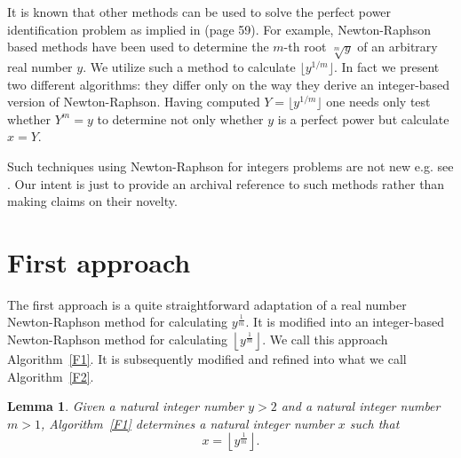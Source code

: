 \documentclass[11pt]{article}
\newtheorem{lem}{Lemma}
\newcommand{\floor}[1]{\lfloor #1 \rfloor}
\begin{document}
It is known that other methods can be used to solve the perfect
power identification problem as implied in \cite{BS} (page 59).
For example, Newton-Raphson based
methods have been used to determine the $m$-th root $\sqrt[m]{y}$
of an arbitrary real number $y$.
We utilize such a method to calculate $\floor{y^{1/m}}$.
In fact we present two different algorithms: they differ only on
the way they derive an integer-based version of Newton-Raphson.
Having computed $Y=\floor{y^{1/m}}$ one needs only test whether
$Y^m = y$ to determine not only whether $y$ is a perfect power but
calculate $x=Y$.

Such techniques using Newton-Raphson for integers problems are
not new e.g. see \cite{BS}. Our intent is just to provide 
an archival reference to such methods rather than making 
claims on their novelty.

\section{First approach}


The first approach is a quite straightforward adaptation
of a real number Newton-Raphson method for calculating
    $  y^{\frac{1}{m}}  $.
It is modified into  an integer-based Newton-Raphson method 
for calculating
    $ \left\lfloor y^{\frac{1}{m}} \right\rfloor $.
We call this approach Algorithm~\ref{F1}.
It is subsequently modified and refined into what 
we call Algorithm~\ref{F2}.

\begin{lem}
Given a natural integer number $y>2$ and
a natural integer number $m>1$,
Algorithm~\ref{F1} 
determines a natural integer number $x$ 
such that
\[
 x  =    \left\lfloor y^{\frac{1}{m}} \right\rfloor .
\]
\end{lem}
\end{document}

